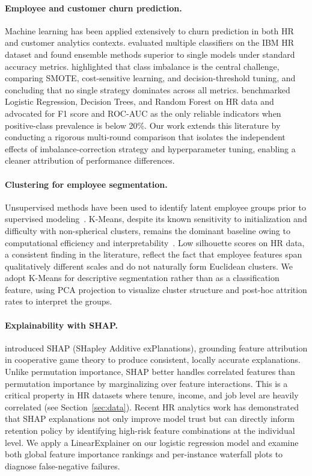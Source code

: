 \documentclass{article}
\begin{document}
\paragraph{Employee and customer churn prediction.}
Machine learning has been applied extensively to churn prediction in both
HR and customer analytics contexts. \citet{alduayj2018predicting} evaluated
multiple classifiers on the IBM HR dataset and found ensemble methods
superior to single models under standard accuracy metrics. \citet{zhao2018employee}
highlighted that class imbalance is the central challenge, comparing SMOTE,
cost-sensitive learning, and decision-threshold tuning, and concluding that
no single strategy dominates across all metrics. \citet{fallucchi2020predicting}
benchmarked Logistic Regression, Decision Trees, and Random Forest on HR
data and advocated for F1 score and ROC-AUC as the only reliable indicators
when positive-class prevalence is below 20\%. Our work extends this
literature by conducting a rigorous multi-round comparison that isolates the
independent effects of imbalance-correction strategy and hyperparameter
tuning, enabling a cleaner attribution of performance differences.

\paragraph{Clustering for employee segmentation.}
Unsupervised methods have been used to identify latent employee groups
prior to supervised modeling~\citep{jain2018study}. K-Means, despite its
known sensitivity to initialization and difficulty with non-spherical
clusters, remains the dominant baseline owing to computational efficiency
and interpretability~\citep{macqueen1967}. Low silhouette scores on HR
data, a consistent finding in the literature, reflect the fact that
employee features span qualitatively different scales and do not naturally
form Euclidean clusters. We adopt K-Means for descriptive segmentation
rather than as a classification feature, using PCA projection to visualize
cluster structure and post-hoc attrition rates to interpret the groups.

\paragraph{Explainability with SHAP.}
\citet{lundberg2017unified} introduced SHAP (SHapley Additive
exPlanations), grounding feature attribution in cooperative game theory to
produce consistent, locally accurate explanations. Unlike permutation
importance, SHAP better handles correlated features than permutation importance by marginalizing
over feature interactions. This is a critical property in HR datasets where tenure,
income, and job level are heavily correlated (see Section~\ref{sec:data}).
Recent HR analytics work has demonstrated that SHAP explanations not only
improve model trust but can directly inform retention policy by identifying
high-risk feature combinations at the individual level. We apply a
LinearExplainer on our logistic regression model and examine both global
feature importance rankings and per-instance waterfall plots to diagnose
false-negative failures.
\end{document}
